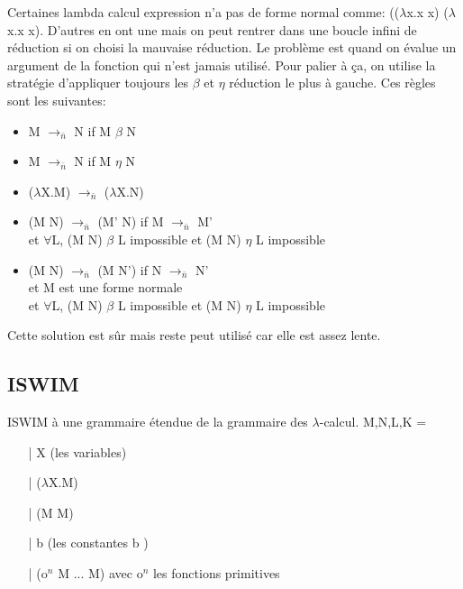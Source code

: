 \documentclass[10pt,a4paper]{article}
\begin{document}
				Certaines lambda calcul expression n'a pas de forme normal comme: (($\lambda$x.x x) ($\lambda$x.x x). 
				\newline
				D'autres en ont une mais on peut rentrer dans une boucle infini de r\'{e}duction si on choisi la mauvaise r\'{e}duction.
				\medbreak
				Le probl\`{e}me est quand on \'{e}value un argument de la fonction qui n'est jamais utilis\'{e}. Pour palier \`{a} ça, on utilise la strat\'{e}gie d'appliquer toujours les $\beta$ et $\eta$ réduction le plus \`{a} gauche. Ces règles sont les suivantes:
				\medbreak
				
				\begin{itemize}
					\item M $\longrightarrow_{\bar{n}}$ N if M $\beta$ N
					\item M $\longrightarrow_{\bar{n}}$ N if M $\eta$ N
					\item ($\lambda$X.M) $\longrightarrow_{\bar{n}}$ ($\lambda$X.N)
					\item (M N) $\longrightarrow_{\bar{n}}$ (M' N) if M $\longrightarrow_{\bar{n}}$ M'
					\\ et $\forall$L, (M N) $\beta$ L impossible et (M N) $\eta$ L impossible
					\item (M N) $\longrightarrow_{\bar{n}}$ (M N') if N $\longrightarrow_{\bar{n}}$ N'
					\\ et M est une forme normale
					\\ et  $\forall$L, (M N) $\beta$ L impossible et (M N) $\eta$ L impossible
				\end{itemize}
				
				Cette solution est s\^{u}r mais reste peut utilis\'{e} car elle est assez lente. 
			\newpage
			\subsection{ISWIM}	
			
				ISWIM à une grammaire étendue de la grammaire des $\lambda$-calcul.
				\smallbreak
				M,N,L,K =
				\begin{itemize}
					\item[|] X (les variables)
					\item[|] ($\lambda$X.M)
					\item[|] (M M)
					\item[|] b (les constantes b )
					\item[|] (o$^{n}$ M ... M) avec o$^{n}$ les fonctions primitives
				\end{itemize}
				\medbreak
				
\end{document}
